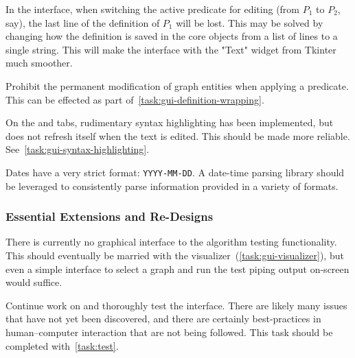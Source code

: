 \begin{task}
  \label{task:definition-newline}
  In the interface, when switching the active predicate for editing
    (from $P_1$ to $P_2$, say),
    the last line of the definition of $P_1$ will be lost.
  This may be solved by changing how the definition
    is saved in the core objects from
    a list of lines to a single string.
  This will make the interface with the
    "Text" widget from Tkinter much smoother.
\end{task}

\begin{task}
  \label{task:valid-pred}
  Prohibit the permanent modification of graph entities when applying a predicate.
  This can be effected as part of~\autoref{task:gui-definition-wrapping}.
\end{task}

\begin{task}
  \label{task:reliable-hl}
  On the  and  tabs,
    rudimentary syntax highlighting has been implemented,
    but does not refresh itself when the text is edited.
  This should be made more reliable.
  See~\autoref{task:gui-syntax-highlighting}.
\end{task}

\begin{task}
  \label{task:dates}
  Dates have a very strict format: \texttt{YYYY-MM-DD}.  A date-time
  parsing library should be leveraged to consistently parse
  information provided in a variety of formats.
\end{task}

\subsubsection{Essential Extensions and Re-Designs}

\begin{task}
  \label{task:testing-interface}
  There is currently no graphical interface to the algorithm testing functionality.
  This should eventually be married with the visualizer~(\autoref{task:gui-visualizer}),
    but even a simple interface to select a graph and run the test \Dash
    piping output on-screen \Dash would suffice.
\end{task}

\begin{task}
  \label{task:interface}
  Continue work on and thoroughly test the interface.
  There are likely many issues that have not yet been discovered,
    and there are certainly best-practices in human--computer interaction
    that are not being followed.
  This task should be completed with~\autoref{task:test}.
\end{task}

